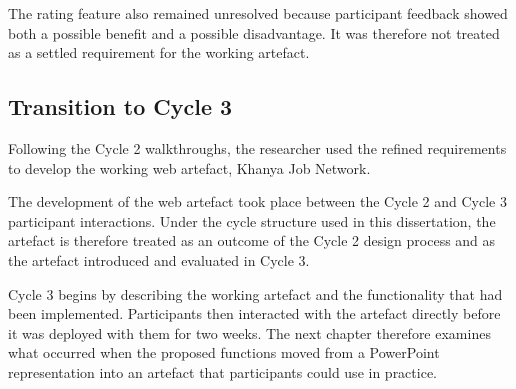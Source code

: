 The rating feature also remained unresolved because participant feedback showed both a possible benefit and a possible disadvantage. It was therefore not treated as a settled requirement for the working artefact.


\subsection{Transition to Cycle 3}

Following the Cycle 2 walkthroughs, the researcher used the refined requirements to develop the working web artefact, Khanya Job Network.

The development of the web artefact took place between the Cycle 2 and Cycle 3 participant interactions. Under the cycle structure used in this dissertation, the artefact is therefore treated as an outcome of the Cycle 2 design process and as the artefact introduced and evaluated in Cycle 3.

Cycle 3 begins by describing the working artefact and the functionality that had been implemented. Participants then interacted with the artefact directly before it was deployed with them for two weeks. The next chapter therefore examines what occurred when the proposed functions moved from a PowerPoint representation into an artefact that participants could use in practice.